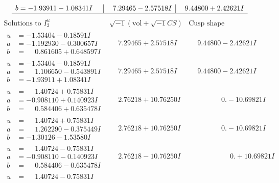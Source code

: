 \documentclass[1p]{elsarticle_modified}
\theoremstyle{definition}
\newcommand{\I}{\sqrt{-1}}
\begin{document}
$$\begin{array}{c|c|c}
\begin{aligned}
b &= -1.93911 - 1.08341 I\end{aligned}
 & \phantom{-}7.29465 - 2.57518 I & \phantom{-}9.44800 + 2.42621 I\\
 \hline 
 \end{array}$$\newpage$$\begin{array}{c|c|c}  
\text{Solutions to }I^u_{2}& \I (\text{vol} + \sqrt{-1}CS) & \text{Cusp shape}\\
 \hline 
\begin{aligned}
u &= -1.53404 - 0.18591 I \\
a &= -1.192930 - 0.300657 I \\
b &= \phantom{-}0.861605 + 0.648597 I\end{aligned}
 & \phantom{-}7.29465 + 2.57518 I & \phantom{-}9.44800 - 2.42621 I \\ \hline\begin{aligned}
u &= -1.53404 - 0.18591 I \\
a &= \phantom{-}1.106650 - 0.543891 I \\
b &= -1.93911 + 1.08341 I\end{aligned}
 & \phantom{-}7.29465 + 2.57518 I & \phantom{-}9.44800 - 2.42621 I \\ \hline\begin{aligned}
u &= \phantom{-}1.40724 + 0.75831 I \\
a &= -0.908110 + 0.140923 I \\
b &= \phantom{-}0.584406 + 0.635478 I\end{aligned}
 & \phantom{-}2.76218 + 10.76250 I & \phantom{-0.000000 } 0. - 10.69821 I \\ \hline\begin{aligned}
u &= \phantom{-}1.40724 + 0.75831 I \\
a &= \phantom{-}1.262290 - 0.375449 I \\
b &= -1.30126 - 1.53580 I\end{aligned}
 & \phantom{-}2.76218 + 10.76250 I & \phantom{-0.000000 } 0. - 10.69821 I \\ \hline\begin{aligned}
u &= \phantom{-}1.40724 - 0.75831 I \\
a &= -0.908110 - 0.140923 I \\
b &= \phantom{-}0.584406 - 0.635478 I\end{aligned}
 & \phantom{-}2.76218 - 10.76250 I & \phantom{-0.000000 -}0. + 10.69821 I \\ \hline\begin{aligned}
u &= \phantom{-}1.40724 - 0.75831 I \\

\end{aligned}
\end{array}$$
\end{document}
